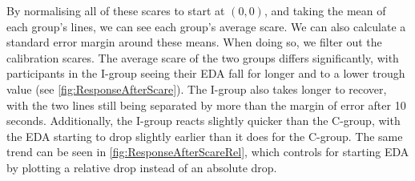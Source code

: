 \documentclass[12pt,a4paper]{article}\usepackage[]{graphicx}\usepackage[]{color}
\begin{document}
By normalising all of these scares to start at $(0,0)$, and taking the mean of each group's lines, we can see each group's average scare.
We can also calculate a standard error margin around these means.
When doing so, we filter out the calibration scares.
The average scare of the two groups differs significantly, with participants in the I-group seeing their EDA fall for longer and to a lower trough value (see \vref{fig:ResponseAfterScare}).
The I-group also takes longer to recover, with the two lines still being separated by more than the margin of error after 10 seconds.
Additionally, the I-group reacts slightly quicker than the C-group, with the EDA starting to drop slightly earlier than it does for the C-group.
The same trend can be seen in \vref{fig:ResponseAfterScareRel}, which controls for starting EDA by plotting a relative drop instead of an absolute drop.
\end{document}
